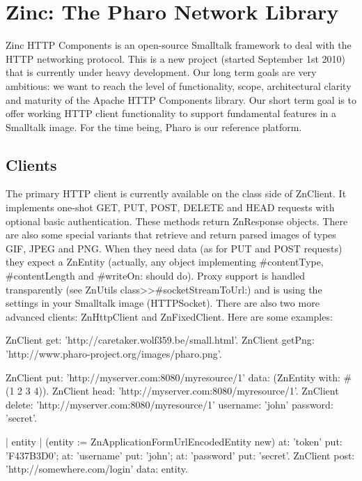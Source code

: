 \documentclass[a4paper,10pt,twoside]{book}
\begin{document}
	\sloppy
\fi
\chapter{Zinc: The Pharo Network Library}

Zinc HTTP Components is an open-source Smalltalk framework to deal with the HTTP networking protocol. This is a new project (started September 1st 2010) that is currently under heavy development. Our long term goals are very ambitious: we want to reach the level of functionality, scope, architectural clarity and maturity of the Apache HTTP Components library. Our short term goal is to offer working HTTP client functionality to support fundamental features in a Smalltalk image. For the time being, Pharo is our reference platform.




\section{Clients}

The primary HTTP client is currently available on the class side of ZnClient. It implements one-shot GET, PUT, POST, DELETE and HEAD requests with optional basic authentication. These methods return ZnResponse objects. There are also some special variants that retrieve and return parsed images of types GIF, JPEG and PNG. When they need data (as for PUT and POST requests) they expect a ZnEntity (actually, any object implementing #contentType, #contentLength and #writeOn: should do). Proxy support is handled transparently (see ZnUtils class>>#socketStreamToUrl:) and is using the settings in your Smalltalk image (HTTPSocket). There are also two more advanced clients: ZnHttpClient and ZnFixedClient. Here are some examples:


\begin{code}{}
ZnClient get: 'http://caretaker.wolf359.be/small.html'.
ZnClient getPng: 'http://www.pharo-project.org/images/pharo.png'.

ZnClient put: 'http://myserver.com:8080/myresource/1' data: (ZnEntity with: #(1 2 3 4)).
ZnClient head: 'http://myserver.com:8080/myresource/1'.
ZnClient delete: 'http://myserver.com:8080/myresource/1' username: 'john' password: 'secret'.
\end{code}

\begin{code}{}
| entity |
(entity := ZnApplicationFormUrlEncodedEntity new)
  at: 'token' put: 'F437B3D0';
  at: 'username' put: 'john';
  at: 'password' put: 'secret'.
ZnClient post: 'http://somewhere.com/login' data: entity.
\end{code}
\end{document}
